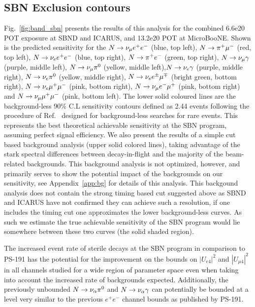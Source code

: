 \documentclass[11pt, a4paper]{article}
\newcommand{\reffig}[1]{Fig.~\ref{#1}}
\newcommand{\refapp}[1]{Appendix~\ref{#1}}
\newcommand{\refref}[1]{Ref.~\cite{#1}}
\def\muboone{MicroBooNE}
\def\ster{\ensuremath N}
\begin{document}
\subsection{SBN Exclusion contours}
%
\reffig{fig:band_sbn} presents the results of this analysis for the combined
6.6e20 POT exposure at SBND and ICARUS, and 13.2e20 POT at \muboone. Shown is
the predicted sensitivity for the $\ster \rightarrow \nu_\mu e^+e^-$ (blue, top
left), $\ster \rightarrow \pi^+ \mu^-$ (red, top left), $\ster \rightarrow
\nu_e e^+ e^-$ (blue, top right),  $\ster \rightarrow \pi^+ e^-$ (green, top
right), $\ster \rightarrow \nu_\mu \gamma$ (purple, middle left), $\ster
\rightarrow \nu_\mu \pi^0$ (yellow, middle left),$\ster \rightarrow \nu_e
\gamma$ (purple, middle right), $\ster \rightarrow \nu_e \pi^0$ (yellow, middle
right), $\ster \rightarrow \nu_e e^\pm \mu^\mp $ (bright green, bottom right),
$\ster \rightarrow \nu_e \mu^+ \mu^- $ (pink, bottom right),  $\ster
\rightarrow \nu_\mu e^- \mu^+$ (pink, bottom right) and $\ster \rightarrow
\nu_\mu \mu^+ \mu^- $ (pink, bottom left). The lower solid coloured lines are
the background-less 90\% C.L sensitivity contours defined as 2.44 events
following the procedure of \refref{Feldman:1997qc} designed for background-less
searches for rare events. This represents the best theoretical achievable
sensitivity at the SBN program, assuming perfect signal efficiency. We also
present the results of a simple cut based background analysis (upper solid
colored lines), taking advantage of the stark spectral differences between
decay-in-flight and the majority of the beam-related backgrounds. This
background analysis is not optimized, however, and primarily serves to show the
potential impact of the backgrounds on our sensitivity,  see \refapp{app:bg}
for details of this analysis. This backgound analysis does not contain the strong timing based cut suggested above as SBND and ICARUS have not confirmed they can achieve such a resolution, if one includes the timing cut one approximates the lower background-less curves. As such we estimate the true achievable sensitivity of
the SBN program would lie somewhere between these two curves (the solid shaded
region). 

The increased event rate of sterile decays at the SBN program in comparison to PS-191 has the potential for the improvement on the bounds on $|U_{e4}|^2$ and $|U_{\mu 4}|^2$ in all channels studied for a wide region of parameter space even when taking into account the increased rate of backgrounds expected. Additionally, the previously unbounded $\ster \rightarrow \nu_\alpha \pi^0$ and $\ster \rightarrow \nu_\alpha \gamma$ can potentially be bounded at a level very similar to the previous $e^+ e^-$ channel bounds as published by PS-191.
\end{document}
